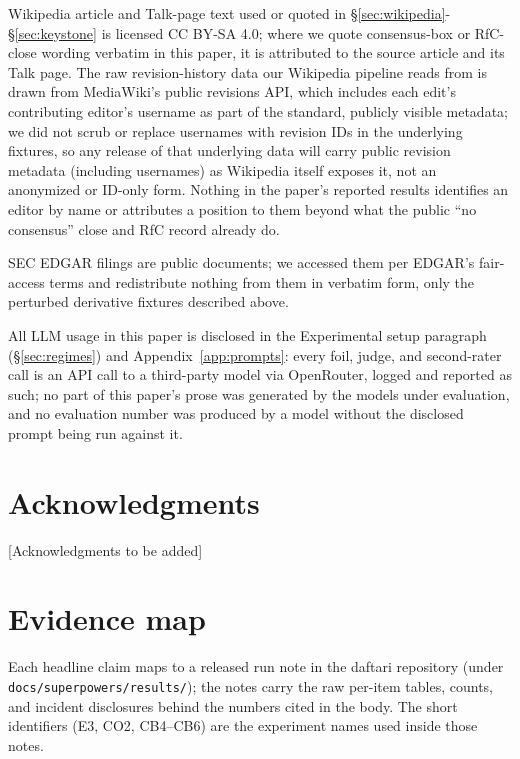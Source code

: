 \documentclass[11pt]{article}
\begin{document}
Wikipedia article and Talk-page text used or quoted in \S\ref{sec:wikipedia}-\S\ref{sec:keystone} is licensed CC BY-SA 4.0; where
we quote consensus-box or RfC-close wording verbatim in this paper, it is attributed to the
source article and its Talk page. The raw revision-history data our Wikipedia pipeline reads
from is drawn from MediaWiki's public revisions API, which includes each edit's contributing
editor's username as part of the standard, publicly visible metadata; we did not scrub or
replace usernames with revision IDs in the underlying fixtures, so any release of that
underlying data will carry public revision metadata (including usernames) as Wikipedia
itself exposes it, not an anonymized or ID-only form. Nothing in the paper's reported results
identifies an editor by name or attributes a position to them beyond what the public ``no
consensus'' close and RfC record already do.

SEC EDGAR filings are public documents; we accessed them per EDGAR's fair-access terms and
redistribute nothing from them in verbatim form, only the perturbed derivative fixtures
described above.

All LLM usage in this paper is disclosed in the Experimental setup paragraph (\S\ref{sec:regimes}) and
Appendix~\ref{app:prompts}: every foil, judge, and second-rater call is an API call to a third-party model
via OpenRouter, logged and reported as such; no part of this paper's prose was generated by
the models under evaluation, and no evaluation number was produced by a model without the
disclosed prompt being run against it.

\section*{Acknowledgments}

[Acknowledgments to be added]




\appendix

\section{Evidence map}
\label{app:evidence}

Each headline claim maps to a released run note in the daftari repository (under
\texttt{docs/superpowers/results/}); the notes carry the raw per-item tables, counts, and
incident disclosures behind the numbers cited in the body. The short identifiers (E3, CO2,
CB4--CB6) are the experiment names used inside those notes.
\end{document}
